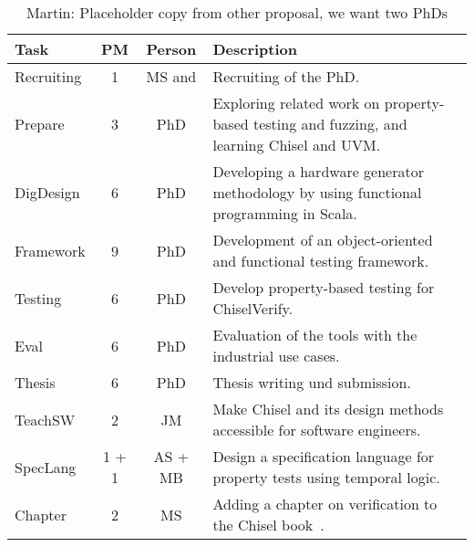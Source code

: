 \documentclass[fleqn,12pt]{article}
\newcommand{\martin}[1]{{\color{blue} Martin: #1}}
\begin{document}
\begin{table*}%
{\small
  \begin{center}
    \begin{tabular}{lccp{110mm}l}
      \toprule
      Task                   & PM  & Person    & Description                                                                                   \\
      \midrule
      Recruiting             & 1   & MS and  & Recruiting of the PhD.                                                                    \\
      \midrule
      Prepare                & 3   & PhD      & Exploring related work on property-based testing and fuzzing, and learning Chisel and UVM.                           \\
      DigDesign               & 6   & PhD      & Developing a hardware generator methodology by using functional programming in Scala.         \\
      Framework              & 9   & PhD      & Development of an object-oriented and functional testing framework.                      \\
      Testing & 6   & PhD      & Develop property-based testing for ChiselVerify.                                                      \\
      Eval                   & 6 & PhD    & Evaluation of the tools with the industrial use cases.                                                     \\
      Thesis                 & 6   & PhD    & Thesis writing und submission.                                                                \\
      \midrule
      TeachSW                 &  2  & JM            & Make Chisel and its design methods accessible for software engineers. \\
      SpecLang                &    1 + 1   &  AS + MB & Design a specification language for property tests using temporal logic. \\
      Chapter                & 2   & MS        & Adding a chapter on verification to the Chisel book~\cite{chisel:book}.                       \\
      \bottomrule
    \end{tabular}
  \end{center}
  \caption{\martin{Placeholder copy from other proposal, we want two PhDs}}\label{tab:packages}
}
\end{table*}
\end{document}
